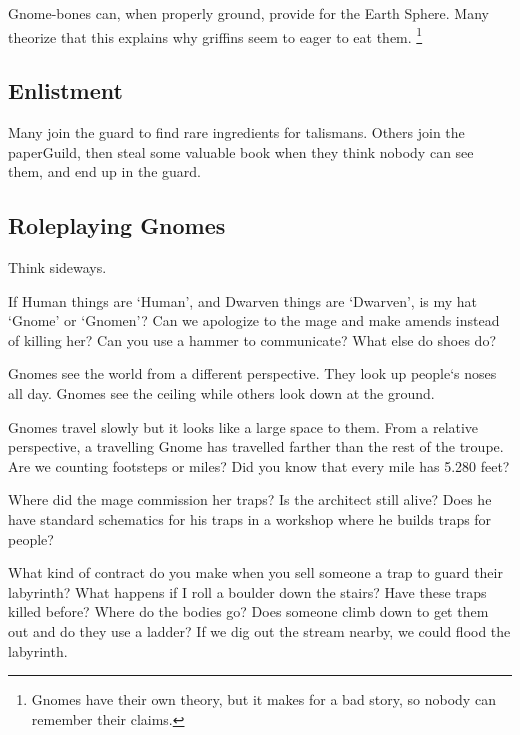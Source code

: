 \begin{multicols}{2}

Gnome-bones can, when properly ground, provide  for the Earth Sphere.
Many theorize that this explains why griffins seem to eager to eat them.%
\footnote{Gnomes have their own theory, but it makes for a bad story, so nobody can remember their claims.}

\subsection{Enlistment}

Many join the \gls{guard} to find rare \glspl{ingredient} for \glspl{talisman}.
Others join the \gls{paperGuild}, then steal some valuable book when they think nobody can see them, and end up in the \gls{guard}.

\subsection{Roleplaying Gnomes}

{\raggedleft Think sideways.\par}
\noindent
If Human things are `Human', and Dwarven things are `Dwarven', is my hat `Gnome' or `Gnomen'?
Can we apologize to the mage and make amends instead of killing her?
Can you use a hammer to communicate?
What else do shoes do?

Gnomes see the world from a different perspective.
They look up people`s noses all day.
Gnomes see the ceiling while others look down at the ground.

Gnomes travel slowly but it looks like a large space to them.
From a relative perspective, a travelling Gnome has travelled farther than the rest of the troupe.
Are we counting footsteps or miles?
Did you know that every mile has 5.280 feet?

Where did the mage commission her traps?
Is the architect still alive?
Does he have standard schematics for his traps in a workshop where he builds traps for people?

What kind of contract do you make when you sell someone a trap to guard their labyrinth?
What happens if I roll a boulder down the stairs?
Have these traps killed before?
Where do the bodies go?
Does someone climb down to get them out and do they use a ladder?
If we dig out the stream nearby, we could flood the labyrinth.

\end{multicols}

